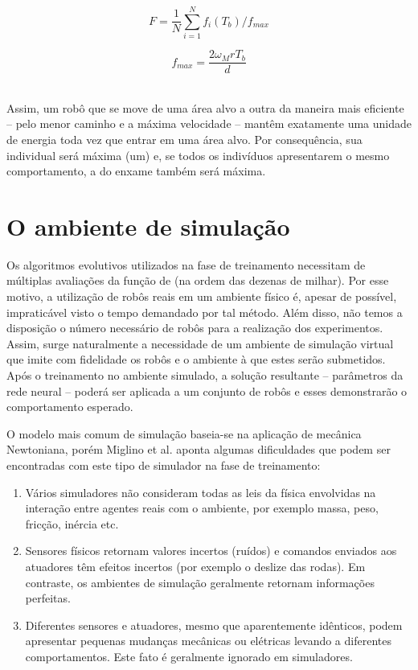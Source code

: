 \noindent\begin{minipage}{.5\linewidth}
\begin{equation}
\label{eq:fitness-alg3}
F = \frac{1}{N} \sum_{i=1}^{N} f_{i} (T_{b}) / f_{max}
\end{equation}
\end{minipage}%
\begin{minipage}{.5\linewidth}
\begin{equation}
\label{eq:fitness-alg4}
f_{max} = \frac{2 \omega_{M} r T_{b}}{d}
\end{equation}
\end{minipage}\\

Assim, um robô que se move de uma área alvo a outra da maneira mais eficiente -- pelo menor caminho e a máxima velocidade -- mantêm exatamente uma unidade de energia toda vez que entrar em uma área alvo. Por consequência, sua \fitness individual será máxima (um) e, se todos os indivíduos apresentarem o mesmo comportamento, a \fitness do enxame também será máxima.

\section{O ambiente de simulação}
\label{sec:simulation}

Os algoritmos evolutivos utilizados na fase de treinamento necessitam de múltiplas avaliações da função de \fitness (na ordem das dezenas de milhar). Por esse motivo, a utilização de robôs reais em um ambiente físico é, apesar de possível, impraticável visto o tempo demandado por tal método. Além disso, não temos a disposição o número necessário de robôs para a realização dos experimentos. Assim, surge naturalmente a necessidade de um ambiente de simulação virtual que imite com fidelidade os robôs e o ambiente à que estes serão submetidos. Após o treinamento no ambiente simulado, a solução resultante -- parâmetros da rede neural -- poderá ser aplicada a um conjunto de robôs e esses demonstrarão o comportamento esperado.

O modelo mais comum de simulação baseia-se na aplicação de mecânica Newtoniana, porém Miglino et al. \cite{miglino1996evolving} aponta algumas dificuldades que podem ser encontradas com este tipo de simulador na fase de treinamento:
\begin{enumerate}
    \item Vários simuladores não consideram todas as leis da física envolvidas na interação entre agentes reais com o ambiente, por exemplo massa, peso, fricção, inércia etc.
    \item Sensores físicos retornam valores incertos (ruídos) e comandos enviados aos atuadores têm efeitos incertos (por exemplo o deslize das rodas). Em contraste, os ambientes de simulação geralmente retornam informações perfeitas.
    \item Diferentes sensores e atuadores, mesmo que aparentemente idênticos, podem apresentar pequenas mudanças mecânicas ou elétricas levando a diferentes comportamentos. Este fato é geralmente ignorado em simuladores.
\end{enumerate}

